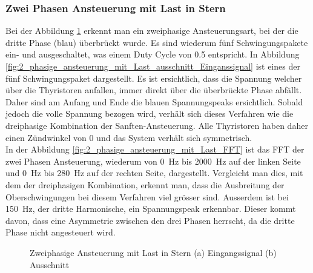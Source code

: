 
\subsubsection*{Zwei Phasen Ansteuerung mit Last in Stern}\label{sec:2_phasen_Ansteuerung}
Bei der Abbildung \ref{fig:2_phasige_ansteuerung_mit_Last} erkennt man ein zweiphasige Ansteuerungsart, bei der die dritte Phase (blau) überbrückt wurde. Es sind wiederum fünf Schwingungspakete ein- und ausgeschaltet, was einem Duty Cycle von 0.5 entspricht. In Abbildung \ref{fig:2_phasige_ansteuerung_mit_Last_ausschnitt_Einganssignal} ist eines der fünf Schwingungspaket dargestellt. Es ist ersichtlich, dass die Spannung welcher über die Thyristoren anfallen, immer direkt über die überbrückte Phase abfällt. Daher sind am Anfang und Ende die blauen Spannungspeaks ersichtlich. Sobald jedoch die volle Spannung bezogen wird, verhält sich dieses Verfahren wie die dreiphasige Kombination der Sanften-Ansteuerung. Alle Thyristoren haben daher einen Zündwinkel von 0\textdegree\hspace{0.02cm} und das System verhält sich symmetrisch.\\
In der Abbildung \ref{fig:2_phasige_ansteuerung_mit_Last_FFT} ist das FFT der zwei Phasen Ansteuerung, wiederum von \SI{0}{Hz} bis \SI{2000}{Hz} auf der linken Seite und \SI{0}{Hz} bis \SI{280}{Hz} auf der rechten Seite, dargestellt. Vergleicht man dies, mit dem der dreiphasigen Kombination, erkennt man, dass die Ausbreitung der Oberschwingungen bei diesem Verfahren viel grösser sind. Ausserdem ist bei \SI{150}{Hz}, der dritte Harmonische, ein Spannungspeak erkennbar. Dieser kommt davon, dass eine Asymmetrie zwischen den drei Phasen herrscht, da die dritte Phase nicht angesteuert wird.

\begin{figure}[ht!]
	\centering
	\qquad
	\caption{Zweiphasige Ansteuerung mit Last in Stern (a) Eingangssignal (b) Ausschnitt}
	\label{fig:2_phasige_ansteuerung_mit_Last}
\end{figure}


